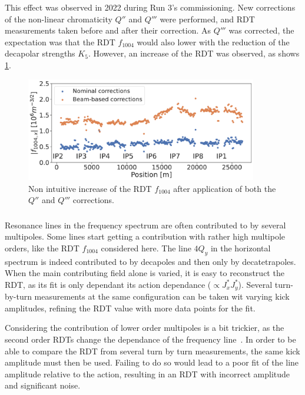 This effect was observed in 2022 during Run 3's commissioning. New corrections of the non-linear
chromaticity $Q''$ and $Q'''$ were performed, and RDT measurements taken before and after their
correction. As $Q'''$ was corrected, the expectation was that the RDT $f_{1004}$ would also lower
with the reduction of the decapolar strengths $K_5$. However, an increase of the RDT was observed,
as shows \cref{fig:decapoles:f1004_dq2_dq3}.

\begin{figure}[H]
    \centering
    \includegraphics[width=0.9\textwidth]{./images/f1004_dq2_dq3_2022.pdf}    
    \caption{Non intuitive increase of the RDT $f_{1004}$ after application of both the $Q''$ and
    $Q'''$ corrections.}
    \label{fig:decapoles:f1004_dq2_dq3}
\end{figure}


\subsubsection{}

Resonance lines in the frequency spectrum are often contributed to by several multipoles. Some lines
start getting a contribution with rather high multipole orders, like the RDT $f_{1004}$ considered
here. The line $4Q_y$ in the horizontal spectrum is indeed contributed to by decapoles and then only
by decatetrapoles. When the main contributing field alone is varied, it is easy to reconstruct the
RDT, as its fit is only dependant its action dependance ($\propto J_x^{*} J_y^{*}$). Several
turn-by-turn measurements at the same configuration can be taken wit varying kick amplitudes,
refining the RDT value with more data points for the fit.

Considering the contribution of lower order multipoles is a bit trickier, as the second order RDTs
change the dependance of the frequency line~\cite{franchi_first_2014}. In order to be able to
compare the RDT from several turn by turn measurements, the same kick amplitude must then be used.
Failing to do so would lead to a poor fit of the line amplitude relative to the action, resulting in
an RDT with incorrect amplitude and significant noise.

